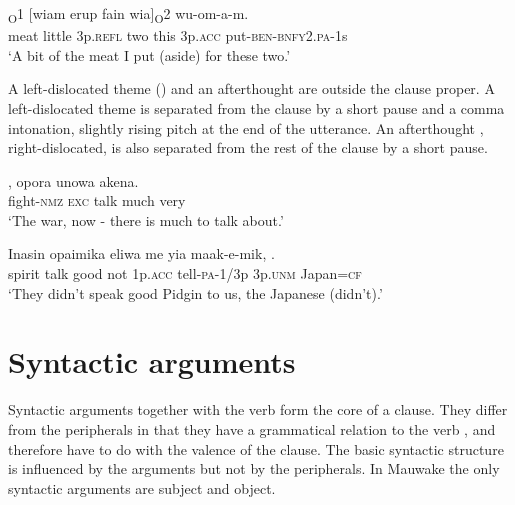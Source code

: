 \ea%
\label{ex:5:x930}
\textsubscript{O}1  [wiam  erup  fain  wia]\textsubscript{O}2 wu-om-a-m. \\
     meat  little  3p.\textsc{refl}  two  this  3p.\textsc{acc} put-\textsc{ben}-\textsc{bnfy}2.\textsc{pa}-1s \\
\glt `A bit of the meat I put (aside) for these two.'
\z

A left-dislocated theme () and an afterthought are outside the clause proper.  A left-dislocated theme  is separated from the clause by a short pause and a comma intonation, slightly rising pitch at the end of the utterance.  An afterthought , right-dislocated, is also separated from the rest of the clause by a short pause.

\ea%
\label{ex:5:x935}
\gll {},  opora  unowa  akena. \\
     fight-\textsc{nmz}  \textsc{exc}  talk  much  very \\
\glt `The war, now - there is much to talk about.'
\z

\ea%
\label{ex:5:x929}
\gll Inasin  opaimika  eliwa  me  yia  maak-e-mik,   . \\
     spirit  talk  good  not  1p.\textsc{acc}  tell-\textsc{pa}-1/3p  3p.\textsc{unm} Japan=\textsc{cf} \\
\glt `They didn't speak good Pidgin to us, the Japanese (didn't).'
\z

\section{Syntactic arguments} \label{sec:5.2}

Syntactic arguments together with the verb form the core of a clause. They differ from the peripherals in that they have a grammatical relation to the verb \citep[][77--80]{FoleyEtAl1984}, and therefore have to do with the valence of the clause. The basic syntactic structure is influenced by the arguments but not by the peripherals.  In Mauwake the only syntactic arguments are subject and object. 

